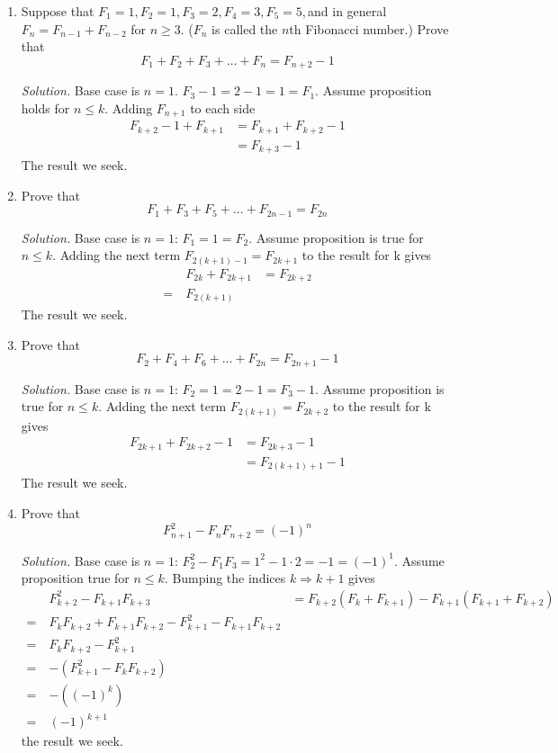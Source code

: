 \documentclass[12pt]{article}
\newcommand\sol[1]{\begin{mdframed}
\emph{Solution.} #1
\end{mdframed}}
\begin{document}
\begin{enumerate}
  \item Suppose that $F_1=1, F_2=1,F_3=2,F_4=3,F_5=5,$and in general$F_n = F_{n-1}+F_{n-2}$ for $n \ge 3$. ($F_n$ is called the $n$th Fibonacci number.) Prove that
    \[
    F_1 + F_2 + F_3 + \ldots + F_n = F_{n+2} - 1
    \]
    \sol{Base case is $n=1$. $F_3 - 1 = 2 - 1 = 1 = F_1$. Assume proposition holds for $n\le k$. Adding $F_{n+1}$ to each side
      \begin{align*}
        F_{k+2} - 1 + F_{k+1} &= F_{k+1} + F_{k+2} -1 \\
        &= F_{k+3} - 1
      \end{align*}
      The result we seek.
        
    }

  \item Prove that
    \[
    F_1 + F_3 + F_5 + \ldots + F_{2n-1} = F_{2n}
    \]
    \sol{
      Base case is $n=1$: $F_1 = 1 = F_2$. Assume proposition is true for $n \le k$. Adding the next term $F_{2(k+1)-1} = F_{2k+1}$ to the result for k gives
      \begin{align*}
        & F_{2k} + F_{2k+1} &= F_{2k+2} \\
        =\ & F_{2(k+1)}
      \end{align*}
      The result we seek.
    }

  \item Prove that
    \[
    F_2 + F_4 + F_6 + \ldots + F_{2n} = F_{2n+1} - 1
    \]
    \sol{
            Base case is $n=1$: $F_2 = 1 = 2 - 1 = F_3 - 1$. Assume proposition is true for $n \le k$. Adding the next term $F_{2(k+1)} = F_{2k+2}$ to the result for k gives
      \begin{align*}
        F_{2k+1} + F_{2k+2} - 1 &= F_{2k+3} - 1\\
        &= F_{2(k+1)+1} - 1
      \end{align*}
      The result we seek.
    }

  \item Prove that
    \[
    F_{n+1}^2 - F_nF_{n+2} = (-1)^n
    \]
    \sol{ Base case is $n=1$: $F_2^2 - F_1F_3 = 1^2 - 1\cdot2 = -1 = (-1)^1$.
      Assume proposition true for $n \le k$. Bumping the indices $k \Rightarrow k+1$ gives
      \begin{align*}
        & F_{k+2}^2 - F_{k+1}F_{k+3} &= F_{k+2}(F_k + F_{k+1}) - F_{k+1}(F_{k+1} + F_{k+2}) \\
        =\ & F_kF_{k+2} + F_{k+1}F_{k+2} -F_{k+1}^2 - F_{k+1}F_{k+2} \\
        =\ & F_kF_{k+2} - F_{k+1}^2 \\
        =\ & -(F_{k+1}^2 - F_kF_{k+2}) \\
        =\ & -((-1)^k) \\
        =\ & (-1)^{k+1}
      \end{align*}
      the result we seek.
    }


\end{enumerate}
\end{document}
